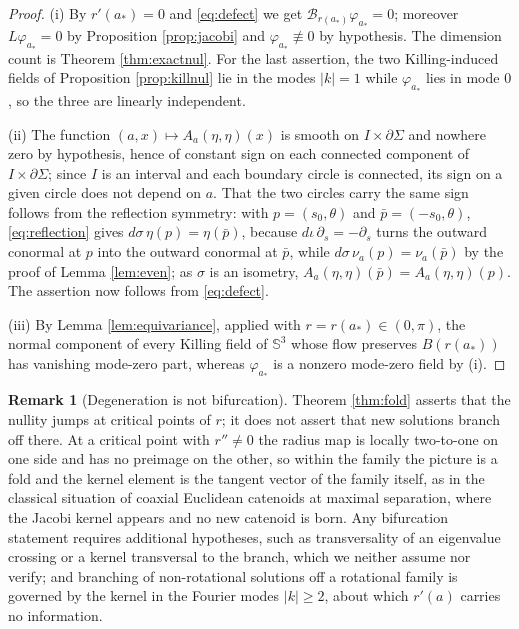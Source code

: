 \documentclass[11pt,a4paper]{amsart}
\theoremstyle{plain}
\theoremstyle{definition}
\newtheorem{remark}[theorem]{Remark}
\newcommand{\Sph}{\mathbb{S}}
\begin{document}
\begin{proof}
(i) By $r'(a_*)=0$ and \eqref{eq:defect} we get $\mathcal{B}_{r(a_*)}\varphi_{a_*}=0$; moreover $L\varphi_{a_*}=0$ by Proposition \ref{prop:jacobi} and $\varphi_{a_*}\not\equiv 0$ by hypothesis. The dimension count is Theorem \ref{thm:exactnul}. For the last assertion, the two Killing-induced fields of Proposition \ref{prop:killnul} lie in the modes $|k|=1$ while $\varphi_{a_*}$ lies in mode $0$, so the three are linearly independent.

(ii) The function $(a,x)\mapsto A_a(\eta,\eta)(x)$ is smooth on $I\times\partial\Sigma$ and nowhere zero by hypothesis, hence of constant sign on each connected component of $I\times\partial\Sigma$; since $I$ is an interval and each boundary circle is connected, its sign on a given circle does not depend on $a$. That the two circles carry the same sign follows from the reflection symmetry: with $p=(s_0,\theta)$ and $\bar p=(-s_0,\theta)$, \eqref{eq:reflection} gives $d\sigma\,\eta(p)=\eta(\bar p)$, because $d\iota\,\partial_s=-\partial_s$ turns the outward conormal at $p$ into the outward conormal at $\bar p$, while $d\sigma\,\nu_a(p)=\nu_a(\bar p)$ by the proof of Lemma \ref{lem:even}; as $\sigma$ is an isometry, $A_a(\eta,\eta)(\bar p)=A_a(\eta,\eta)(p)$. The assertion now follows from \eqref{eq:defect}.

(iii) By Lemma \ref{lem:equivariance}, applied with $r=r(a_*)\in(0,\pi)$, the normal component of every Killing field of $\Sph^3$ whose flow preserves $B(r(a_*))$ has vanishing mode-zero part, whereas $\varphi_{a_*}$ is a nonzero mode-zero field by (i).
\end{proof}

\begin{remark}[Degeneration is not bifurcation]\label{rem:nobif}
Theorem \ref{thm:fold} asserts that the nullity jumps at critical points of $r$; it does not assert that new solutions branch off there. At a critical point with $r''\neq 0$ the radius map is locally two-to-one on one side and has no preimage on the other, so within the family the picture is a fold and the kernel element is the tangent vector of the family itself, as in the classical situation of coaxial Euclidean catenoids at maximal separation, where the Jacobi kernel appears and no new catenoid is born. Any bifurcation statement requires additional hypotheses, such as transversality of an eigenvalue crossing or a kernel transversal to the branch, which we neither assume nor verify; and branching of non-rotational solutions off a rotational family is governed by the kernel in the Fourier modes $|k|\geq 2$, about which $r'(a)$ carries no information.
\end{remark}
\end{document}
